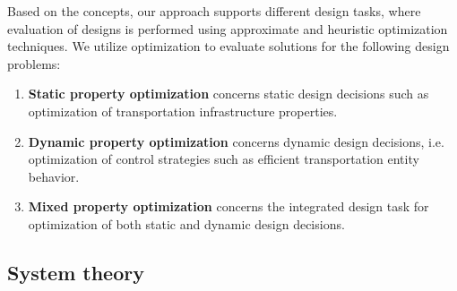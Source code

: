 \documentclass[a4paper,twoside]{article}
\begin{document}
	
	Based on the concepts, our approach supports different design tasks, where evaluation of designs is performed using approximate and heuristic optimization techniques. We utilize optimization to evaluate solutions for the following design problems:
	
	\begin{enumerate}
		\item \textbf{Static property optimization} concerns static design decisions such as optimization of transportation infrastructure properties.
		\item \textbf{Dynamic property optimization} concerns dynamic design decisions, i.e. optimization of control strategies such as efficient transportation entity behavior.
		\item \textbf{Mixed property optimization} concerns the integrated design task for optimization of both static and dynamic design decisions.
	\end{enumerate}
	
	
	
	\subsection{System theory}
	\label{sec:domain-specific-modeling}
	
	
\end{document}
